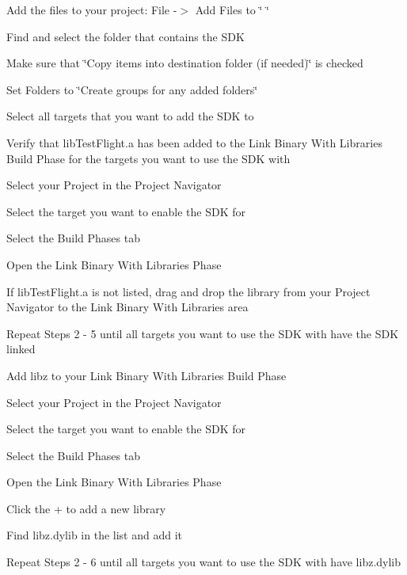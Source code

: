 \begin{DoxyEnumerate}
\item Add the files to your project\-: File -\/$>$ Add Files to \char`\"{} \char`\"{}
\begin{DoxyEnumerate}
\item Find and select the folder that contains the S\-D\-K
\item Make sure that \char`\"{}\-Copy items into destination folder (if needed)\char`\"{} is checked
\item Set Folders to \char`\"{}\-Create groups for any added folders\char`\"{}
\item Select all targets that you want to add the S\-D\-K to
\end{DoxyEnumerate}
\item Verify that lib\-Test\-Flight.\-a has been added to the Link Binary With Libraries Build Phase for the targets you want to use the S\-D\-K with
\begin{DoxyEnumerate}
\item Select your Project in the Project Navigator
\item Select the target you want to enable the S\-D\-K for
\item Select the Build Phases tab
\item Open the Link Binary With Libraries Phase
\item If lib\-Test\-Flight.\-a is not listed, drag and drop the library from your Project Navigator to the Link Binary With Libraries area
\item Repeat Steps 2 -\/ 5 until all targets you want to use the S\-D\-K with have the S\-D\-K linked
\end{DoxyEnumerate}
\item Add libz to your Link Binary With Libraries Build Phase
\begin{DoxyEnumerate}
\item Select your Project in the Project Navigator
\item Select the target you want to enable the S\-D\-K for
\item Select the Build Phases tab
\item Open the Link Binary With Libraries Phase
\item Click the + to add a new library
\item Find libz.\-dylib in the list and add it
\item Repeat Steps 2 -\/ 6 until all targets you want to use the S\-D\-K with have libz.\-dylib
\end{DoxyEnumerate}
\end{DoxyEnumerate}


